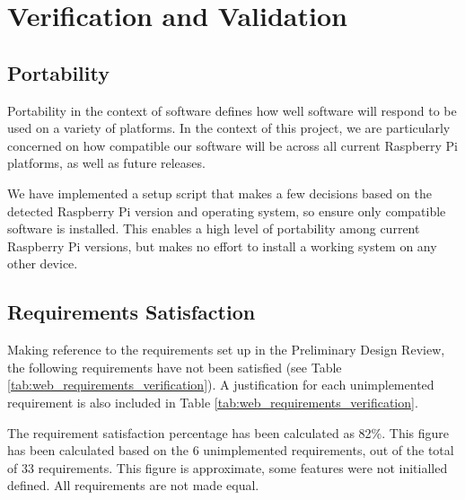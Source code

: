 \section{Verification and Validation}



\subsection{Portability}
Portability in the context of software defines how well software will respond to be used on a variety of platforms. In the context of this project, we are particularly concerned on how compatible our software will be across all current Raspberry Pi platforms, as well as future releases.

We have implemented a setup script that makes a few decisions based on the detected Raspberry Pi version and operating system, so ensure only compatible software is installed. This enables a high level of portability among current Raspberry Pi versions, but makes no effort to install a working system on any other device.


\subsection{Requirements Satisfaction}
Making reference to the requirements set up in the Preliminary Design Review\cite{tibby-lit-review}, the following requirements have not been satisfied (see Table \ref{tab:web_requirements_verification}). A justification for each unimplemented requirement is also included in Table \ref{tab:web_requirements_verification}.

The requirement satisfaction percentage has been calculated as 82\%. This figure has been calculated based on the 6 unimplemented requirements, out of the total of 33 requirements. This figure is approximate, some features were not initialled defined. All requirements are not made equal.

